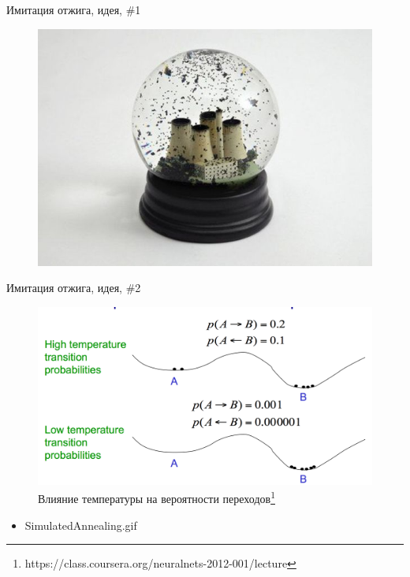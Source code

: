 \documentclass[10pt]{beamer}
\begin{document}
\begin{frame}{Имитация отжига, идея, \#1}

\begin{figure}[h!]
  \centering
  \includegraphics[width=1\textwidth]{images/snowball.jpeg}
\end{figure}

\end{frame}


\begin{frame}{Имитация отжига, идея, \#2}

\begin{figure}[h!]
  \centering
  \includegraphics[width=1\textwidth]{images/sim_an.png}
  \caption{Влияние температуры на вероятности переходов\footnote{https://class.coursera.org/neuralnets-2012-001/lecture}}
\end{figure}

\begin{itemize}
	\item SimulatedAnnealing.gif
\end{itemize}

\end{frame}
\end{document}
